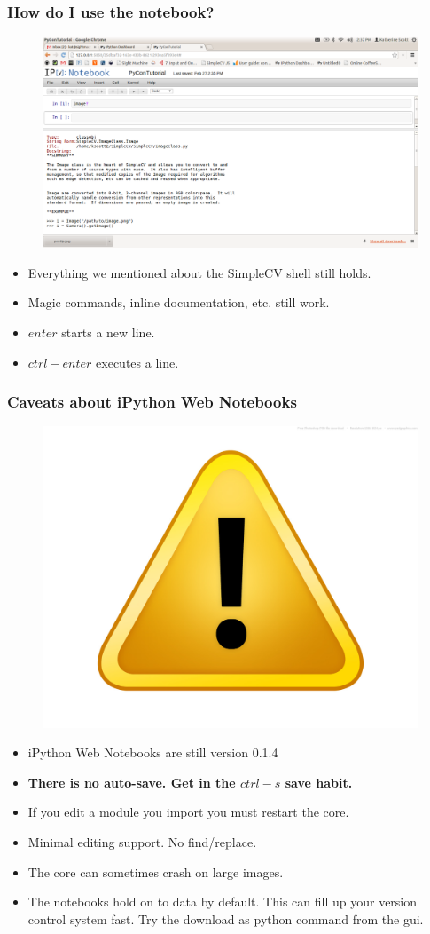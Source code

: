\documentclass{beamer}
\begin{document}
\begin{frame}
\frametitle{How do I use the notebook?}
\begin{figure}
  \includegraphics[width=0.7\linewidth]{ipythonHelp.png}
\end{figure}
\begin{itemize}
\item Everything we mentioned about the SimpleCV shell still holds.
\item Magic commands, inline documentation, etc. still work.
\item $enter$ starts a new line.
\item $ctrl-enter$ executes a line.
\end{itemize}
\end{frame}
\begin{frame}
\frametitle{Caveats about  iPython Web Notebooks}
\begin{figure}
  \includegraphics[width=0.2\linewidth]{warning.jpg}
\end{figure}
\begin{itemize}
\item iPython Web Notebooks are still version 0.1.4 
\item \textbf{There is no auto-save. Get in the $ctrl-s$ save habit.}
\item If you edit a module you import you must restart the core. 
\item Minimal editing support. No find/replace.
\item The core can sometimes crash on large images.
\item The notebooks hold on to data by default. This can fill up your
  version control system fast. Try the download as python command from
  the gui. 
\end{itemize}
\end{frame}
\end{document}
